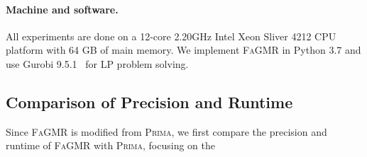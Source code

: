 \documentclass[runningheads]{llncs}
\newcommand{\ourtool}{\textsc{FaGMR}\xspace}
\newcommand{\prima}{\textsc{Prima}\xspace}
\begin{document}
\paragraph{Machine and software.}
All experiments are done on a 12-core 2.20GHz Intel Xeon Sliver 4212 CPU platform
with 64 GB of main memory.
We implement \ourtool in Python 3.7 and use Gurobi 9.5.1~\cite{ref_url3} for LP problem solving.
%
%
%




\subsection{Comparison of Precision and Runtime}\label{Subsec4.2}
Since \ourtool is modified from \prima, we first compare the precision and runtime of \ourtool with \prima, focusing on the 
\end{document}
